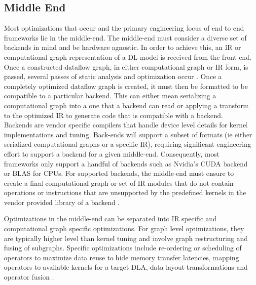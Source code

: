 \subsection{Middle End}
Most optimizations that occur and the primary engineering focus of end to end
frameworks lie in the middle-end. The middle-end must consider a diverse set of
backends in mind and be hardware agnostic. In order to achieve this, an IR or
computational graph representation of a DL model is received from the front
end. Once a constructed dataflow graph, in either computational graph or IR
form, is passed, several passes of static analysis and optimization occur
\cite{TVM} \cite{DLVM} \cite{tensorflow}. Once a completely optimized dataflow
graph is created, it must then be formatted to be compatible to a particular
backend. This can either mean serializing a computational graph into a one
that a backend can read or applying a transform to the optimized IR to generate
code that is compatible with a backend. Backends are vendor specific compilers
that handle device level details for kernel implementations and tuning.
Back-ends will support a subset of formats (ie either serialized computational
graphs or a specific IR), requiring significant engineering
effort to support a backend for a given middle-end. Consequently, most frameworks
only support a handful of backends such as Nvidia's CUDA backend or BLAS for
CPUs. For supported backends, the middle-end must ensure to create a final
computational graph or set of IR modules that do not contain operations or
instructions that are unsupported by the predefined kernels in the vendor
provided library of a backend \cite{TVM}.

Optimizations in the middle-end can be separated into IR specific and
computational graph specific optimizations. For graph level optimizations,
they are typically higher level than kernel tuning and involve graph
restructuring and fusing of subgraphs. Specific optimizations include
re-ordering or scheduling of operators to maximize data reuse
to hide memory transfer latencies, mapping operators to available kernels
for a target DLA, data layout transformations and operator fusion \cite{TVM}.

